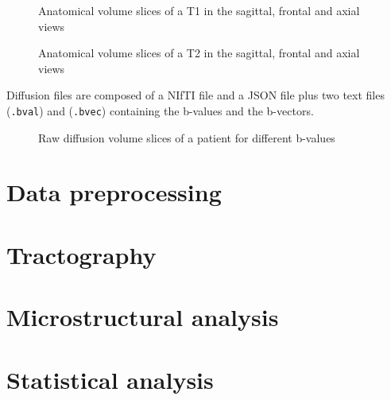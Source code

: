 \begin{figure}[h]
    \centering
    \caption{Anatomical volume slices of a T1 in the sagittal, frontal and axial views}
    \label{fig:T1_images}
  \end{figure}

  \begin{figure}[h]
    \centering
    \caption{Anatomical volume slices of a T2 in the sagittal, frontal and axial views}
    \label{fig:T1_images}
  \end{figure}

 Diffusion files are composed of a NIfTI file and a JSON file plus two text files (\texttt{.bval}) and (\texttt{.bvec}) containing the b-values and the b-vectors.

 \begin{figure}[h]
    \centering
    \caption{Raw diffusion volume slices of a patient for different b-values}
    \label{fig:DwMri_images}
  \end{figure}
 
\section{Data preprocessing}
\section{Tractography}
\section{Microstructural analysis}
\section{Statistical analysis}